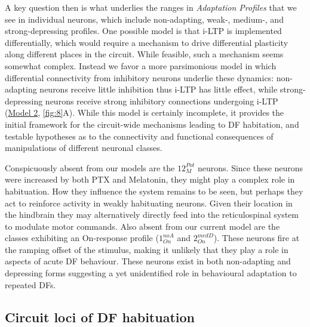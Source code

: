 \documentclass[9pt,lineno]{RandlettLab_elife}
\begin{document}
A key question then is what underlies the ranges in \emph{Adaptation Profiles} that we see in individual neurons, which include non-adapting, weak-, medium-, and strong-depressing profiles. One possible model is that i-LTP is implemented differentially, which would require a mechanism to drive differential plasticity along different places in the circuit. While feasible, such a mechanism seems somewhat complex. Instead we favor a more parsimonious model in which differential connectivity from inhibitory neurons underlie these dynamics: non-adapting neurons receive little inhibition thus i-LTP has little effect, while strong-depressing neurons receive strong inhibitory connections undergoing i-LTP (\underline{Model 2}, \autoref{fig:8}A). While this  model is certainly incomplete, it provides the initial framework for the circuit-wide mechanisms leading to DF habitation, and testable hypotheses as to the connectivity and functional consequences of manipulations of different neuronal classes.

Conspicuously absent from our models are the $12_{M}^{Pot}$ neurons. Since these neurons were increased by both PTX and Melatonin, they might play a complex role in habituation. How they influence the system remains to be seen, but perhaps they act to reinforce activity in weakly habituating neurons. Given their location in the  hindbrain they may alternatively directly feed into the reticulospinal system to modulate motor commands. Also absent from our current model are the classes exhibiting an On-response profile ($1_{On}^{noA}$ and $2_{On}^{medD}$). These neurons fire at the ramping offset of the stimulus, making it unlikely that they play a role in aspects of acute DF behaviour. These neurons exist in both non-adapting and depressing forms suggesting a yet unidentified role in behavioural adaptation to repeated DFs. 

\subsection{Circuit loci of DF habituation}
\end{document}
